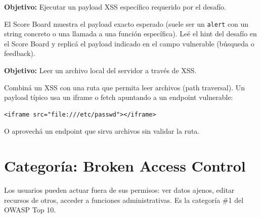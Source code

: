 \documentclass[11pt,a4paper]{article}
\begin{document}
\begin{desafio}
\textbf{Objetivo:} Ejecutar un payload XSS específico requerido por el desafío.
\begin{solucion}
El Score Board muestra el payload exacto esperado (suele ser un \texttt{alert} con un string concreto o una llamada a una función específica). Leé el hint del desafío en el Score Board y replicá el payload indicado en el campo vulnerable (búsqueda o feedback).
\end{solucion}
\end{desafio}

\begin{desafio}
\textbf{Objetivo:} Leer un archivo local del servidor a través de XSS.
\begin{solucion}
Combiná un XSS con una ruta que permita leer archivos (path traversal). Un payload típico usa un iframe o fetch apuntando a un endpoint vulnerable:
\begin{lstlisting}
<iframe src="file:///etc/passwd"></iframe>
\end{lstlisting}
O aprovechá un endpoint que sirva archivos sin validar la ruta.
\end{solucion}
\end{desafio}

\section{Categoría: Broken Access Control}

\begin{teoria}
Los usuarios pueden actuar fuera de sus permisos: ver datos ajenos, editar recursos de otros, acceder a funciones administrativas. Es la categoría \#1 del OWASP Top 10.
\end{teoria}
\end{document}
